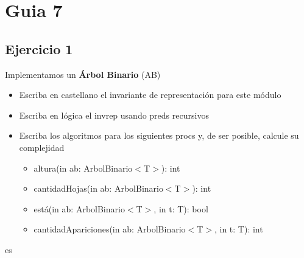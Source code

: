 





\maketitle
\newpage

\tableofcontents
\newpage

\section{Guia 7}

\subsection{Ejercicio 1}
Implementamos un \textbf{Árbol Binario} (AB)

\begin{itemize}
	\item Escriba en castellano el invariante de representación para este módulo
	\item Escriba en lógica el invrep usando preds recursivos
	\item Escriba los algoritmos para los siguientes procs y, de ser posible, calcule su complejidad
	      \begin{itemize}
		      \item altura(in ab: ArbolBinario$<$T$>$): int
		      \item cantidadHojas(in ab: ArbolBinario$<$T$>$): int
		      \item está(in ab: ArbolBinario$<$T$>$, in t: T): bool
		      \item cantidadApariciones(in ab: ArbolBinario$<$T$>$, in t: T): int
	      \end{itemize}
\end{itemize}

\newcommand{\nodo}{}

\nodo es 

